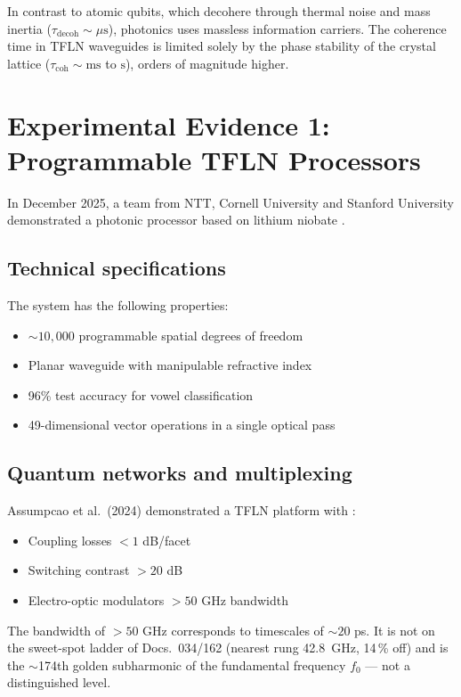 	In contrast to atomic qubits, which decohere through thermal noise and mass inertia ($\tau_{\text{decoh}} \sim \mu\text{s}$), photonics uses massless information carriers. The coherence time in TFLN waveguides is limited solely by the phase stability of the crystal lattice ($\tau_{\text{coh}} \sim \text{ms}$ to $\text{s}$), orders of magnitude higher.
	
	\section{Experimental Evidence 1: Programmable TFLN Processors}
	
	In December 2025, a team from NTT, Cornell University and Stanford University demonstrated a photonic processor based on lithium niobate \cite{NTT2025}.
	
	\subsection{Technical specifications}
	
	The system has the following properties:
	\begin{itemize}
		\item $\sim 10{,}000$ programmable spatial degrees of freedom
		\item Planar waveguide with manipulable refractive index
		\item 96\% test accuracy for vowel classification
		\item 49-dimensional vector operations in a single optical pass
	\end{itemize}
	
	\subsection{Quantum networks and multiplexing}
	\label{sec:186_multiplex}
	
	Assumpcao et al.\ (2024) demonstrated a TFLN platform with \cite{Assumpcao2024}:
	\begin{itemize}
		\item Coupling losses $< 1$ dB/facet
		\item Switching contrast $> 20$ dB
		\item Electro-optic modulators $> 50$ GHz bandwidth
	\end{itemize}
	
	The bandwidth of $>50$ GHz corresponds to timescales of $\sim 20$ ps. It is not on the sweet-spot ladder of Docs.~034/162 (nearest rung 42.8~GHz, 14\,\% off) and is the $\sim$174th golden subharmonic of the fundamental frequency $f_0$ --- not a distinguished level.
	

